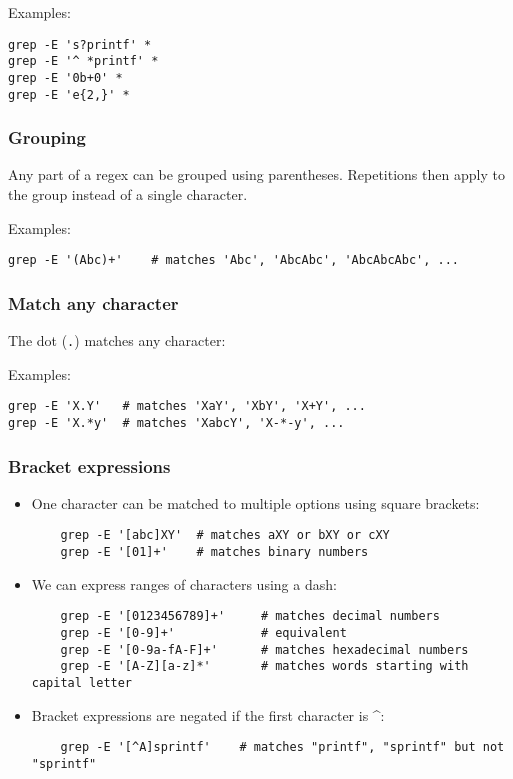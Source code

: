 \documentclass[12pt]{article}
\begin{document}
\noindent Examples:

\begin{lstlisting}
grep -E 's?printf' *
grep -E '^ *printf' *
grep -E '0b+0' *
grep -E 'e{2,}' *
\end{lstlisting}

\subsubsection{Grouping}

Any part of a regex can be grouped using parentheses.
Repetitions then apply to the group instead of a single character.

\noindent Examples:

\begin{lstlisting}
grep -E '(Abc)+'    # matches 'Abc', 'AbcAbc', 'AbcAbcAbc', ...
\end{lstlisting}

\subsubsection{Match any character}

The dot (\texttt{.}) matches any character:

\noindent Examples:

\begin{lstlisting}
grep -E 'X.Y'   # matches 'XaY', 'XbY', 'X+Y', ...
grep -E 'X.*y'  # matches 'XabcY', 'X-*-y', ...
\end{lstlisting}

\subsubsection{Bracket expressions}

\begin{itemize}
    \item One character can be matched to multiple options using square brackets:
    \begin{lstlisting}
    grep -E '[abc]XY'  # matches aXY or bXY or cXY
    grep -E '[01]+'    # matches binary numbers
    \end{lstlisting}

    \item We can express ranges of characters using a dash:
    \begin{lstlisting}
    grep -E '[0123456789]+'     # matches decimal numbers
    grep -E '[0-9]+'            # equivalent
    grep -E '[0-9a-fA-F]+'      # matches hexadecimal numbers
    grep -E '[A-Z][a-z]*'       # matches words starting with capital letter
    \end{lstlisting}

    \item Bracket expressions are negated if the first character is \textasciicircum:
    \begin{lstlisting}
    grep -E '[^A]sprintf'    # matches "printf", "sprintf" but not "sprintf"
    \end{lstlisting}
\end{itemize}
\end{document}
